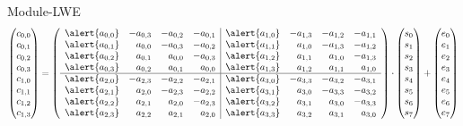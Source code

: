 \documentclass[xcolor=table,10pt,aspectratio=169]{beamer}
\begin{document}
\begin{frame}[label={sec:orgbc8779b}]{Module-LWE}
\[
\begin{pmatrix}c_{0,0} \\ c_{0,1} \\ c_{0,2} \\ c_{0,3} \\ c_{1,0} \\ c_{1,1} \\ c_{1,2} \\ c_{1,3}\end{pmatrix} = 
\left(\begin{array}{rrrr|rrrr}
\alert{a_{0,0}} & -a_{0,3} & -a_{0,2} & -a_{0,1} & \alert{a_{1,0}} & -a_{1,3} & -a_{1,2} & -a_{1,1} \\
\alert{a_{0,1}} &  a_{0,0} & -a_{0,3} & -a_{0,2} & \alert{a_{1,1}} &  a_{1,0} & -a_{1,3} & -a_{1,2} \\
\alert{a_{0,2}} &  a_{0,1} &  a_{0,0} & -a_{0,3} & \alert{a_{1,2}} &  a_{1,1} &  a_{1,0} & -a_{1,3} \\
\alert{a_{0,3}} &  a_{0,2} &  a_{0,1} &  a_{0,0} & \alert{a_{1,3}} &  a_{1,2} &  a_{1,1} &  a_{1,0} \\
\hline
\alert{a_{2,0}} & -a_{2,3} & -a_{2,2} & -a_{2,1} & \alert{a_{3,0}} & -a_{3,3} & -a_{3,2} & -a_{3,1} \\
\alert{a_{2,1}} &  a_{2,0} & -a_{2,3} & -a_{2,2} & \alert{a_{3,1}} &  a_{3,0} & -a_{3,3} & -a_{3,2} \\
\alert{a_{2,2}} &  a_{2,1} &  a_{2,0} & -a_{2,3} & \alert{a_{3,2}} &  a_{3,1} &  a_{3,0} & -a_{3,3} \\
\alert{a_{2,3}} &  a_{2,2} &  a_{2,1} &  a_{2,0} & \alert{a_{3,3}} &  a_{3,2} &  a_{3,1} &  a_{3,0} \\
\end{array}\right)\cdot
\begin{pmatrix}s_{0} \\ s_{1} \\ s_{2} \\ s_{3} \\ s_{4} \\ s_{5} \\ s_{6} \\ s_{7}\end{pmatrix} +
\begin{pmatrix}e_{0} \\ e_{1} \\ e_{2} \\ e_{3} \\ e_{4} \\ e_{5} \\ e_{6} \\ e_{7}\end{pmatrix}
\]
\end{frame}
\end{document}

